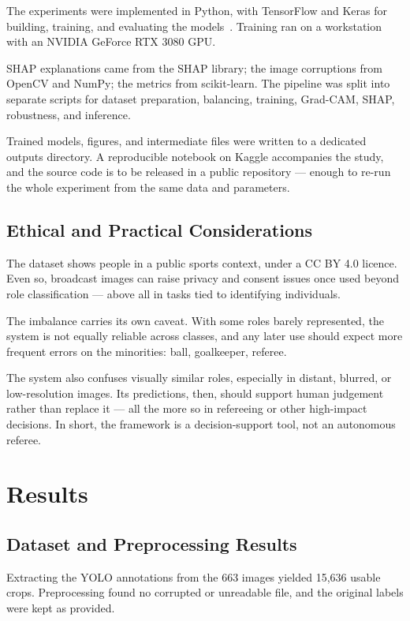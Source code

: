 \documentclass[preprint,12pt]{elsarticle}
\begin{document}
The experiments were implemented in Python, with TensorFlow and Keras for building, training, and evaluating the models~\cite{tensorflow2015}. Training ran on a workstation with an NVIDIA GeForce RTX 3080 GPU.

SHAP explanations came from the SHAP library; the image corruptions from OpenCV and NumPy; the metrics from scikit-learn. The pipeline was split into separate scripts for dataset preparation, balancing, training, Grad-CAM, SHAP, robustness, and inference.

Trained models, figures, and intermediate files were written to a dedicated outputs directory. A reproducible notebook on Kaggle accompanies the study, and the source code is to be released in a public repository --- enough to re-run the whole experiment from the same data and parameters.

\subsection{Ethical and Practical Considerations}

The dataset shows people in a public sports context, under a CC BY 4.0 licence. Even so, broadcast images can raise privacy and consent issues once used beyond role classification --- above all in tasks tied to identifying individuals.

The imbalance carries its own caveat. With some roles barely represented, the system is not equally reliable across classes, and any later use should expect more frequent errors on the minorities: ball, goalkeeper, referee.

The system also confuses visually similar roles, especially in distant, blurred, or low-resolution images. Its predictions, then, should support human judgement rather than replace it --- all the more so in refereeing or other high-impact decisions. In short, the framework is a decision-support tool, not an autonomous referee.

\section{Results}
\label{sec:results}

\subsection{Dataset and Preprocessing Results}

Extracting the YOLO annotations from the 663 images yielded 15,636 usable crops. Preprocessing found no corrupted or unreadable file, and the original labels were kept as provided.
\end{document}
